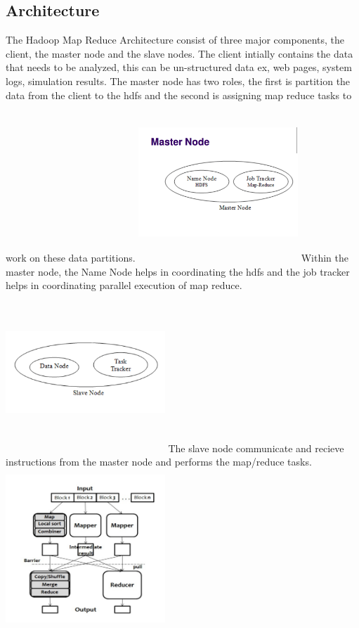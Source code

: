 \documentclass[10pt,twocolumn]{IEEEtran11}
\begin{document}
\subsection{Architecture}
The Hadoop Map Reduce Architecture consist of three major components, the client, the master node and the slave nodes.  The client intially contains the data that needs to be analyzed, this can be un-structured data ex, web pages, system logs, simulation results.  The master node has two roles, the first is partition the data from the client to the hdfs and the second is assigning map reduce tasks to work on these data partitions.
\includegraphics[width=6cm, height=6cm]{masterNode.png}
Within the master node, the Name Node helps in coordinating the hdfs and the job tracker helps in coordinating parallel execution of map reduce.
\includegraphics[width=6cm, height=6cm]{slaveNode.png}
The slave node communicate and recieve instructions from the master node and performs the map/reduce  tasks.
\includegraphics[width=6cm, height=6cm]{mapreduce.png}
\end{document}
